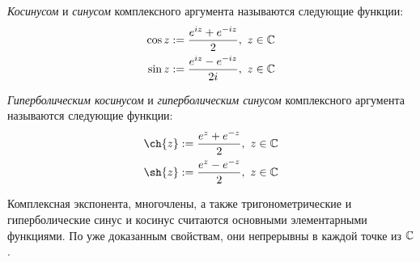 \begin{definition}
	\textit{Косинусом} и \textit{синусом} комплексного аргумента называются следующие функции:
	\begin{align*}
		\cos{z} := \frac{e^{iz} + e^{-iz}}2,~z \in \mathbb{C}
		\\
		\sin{z} := \frac{e^{iz} - e^{-iz}}{2i},~z \in \mathbb{C}
	\end{align*}
\end{definition}

\begin{definition}
	\textit{Гиперболическим косинусом} и \textit{гиперболическим синусом} комплексного аргумента называются следующие функции:
	\begin{align*}
		\ch{z} := \frac{e^{z} + e^{-z}}2,~z \in \Cm
		\\
		\sh{z} := \frac{e^{z} - e^{-z}}{2},~z \in \Cm
	\end{align*}
\end{definition}

\begin{note}
	Комплексная экспонента, многочлены, а также тригонометрические и гиперболические синус и косинус считаются основными элементарными функциями. По уже доказанным свойствам, они непрерывны в каждой точке из $\mathbb{C}$.
\end{note}